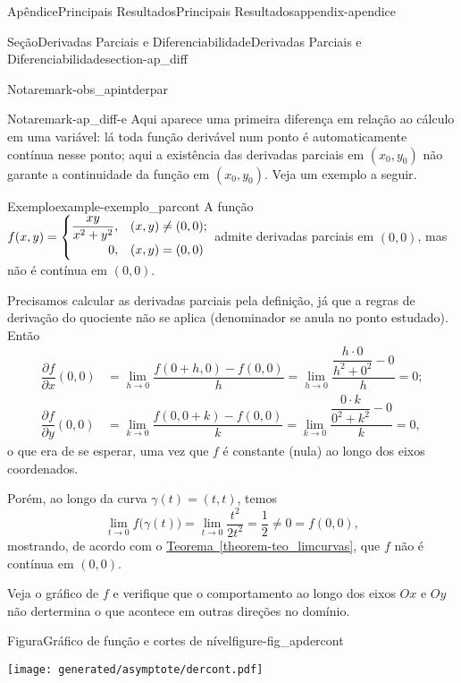 \documentclass[oneside,10pt,]{book}
\newcommand{\xreffont}{\relax}
\numberwithin{equation}{section}
\begin{document}
\begin{appendixptx}{Apêndice}{Principais Resultados}{}{Principais Resultados}{}{}{appendix-apendice}
\begin{sectionptx}{Seção}{Derivadas Parciais e Diferenciabilidade}{}{Derivadas Parciais e Diferenciabilidade}{}{}{section-ap_diff}
\begin{remark}{Nota}{}{remark-obs_apintderpar}
\end{remark}
\begin{remark}{Nota}{}{remark-ap_diff-e}%
Aqui aparece uma primeira diferença em relação ao cálculo em uma variável: lá toda função derivável num ponto é automaticamente contínua nesse ponto; aqui a existência das derivadas parciais em \((x_0,y_0)\) não garante a continuidade da função em \((x_0,y_0)\). Veja um exemplo a seguir.\end{remark}
\begin{example}{Exemplo}{}{example-exemplo_parcont}%
A função \(f(x,y)=\begin{cases}
\dfrac{xy}{x^2+y^2},&(x,y)\neq (0,0);\\
\hfill 0,& (x,y)=(0,0)\end{cases}\) admite derivadas parciais em \((0,0)\), mas não é contínua em \((0,0)\).%
\par
Precisamos calcular as derivadas parciais pela definição, já que a regras de derivação do quociente não se aplica (denominador se anula no ponto estudado). Então%
\begin{align*}
\dfrac{\partial f}{\partial x}(0,0)
&=\lim\limits_{h\to 0}\dfrac{f(0+h,0)-f(0,0)}{h}
=\lim\limits_{h\to 0}\dfrac{\dfrac{h\cdot 0}{h^2+0^2}-0}{h}
=0;\\
\dfrac{\partial f}{\partial y}(0,0)
&=\lim\limits_{k\to 0}\dfrac{f(0,0+k)-f(0,0)}{k}
=\lim\limits_{k\to 0}\dfrac{\dfrac{0\cdot k}{0^2+k^2}-0}{k}
=0,
\end{align*}
o que era de se esperar, uma vez que \(f\) é constante (nula) ao longo dos eixos coordenados.%
\par
Porém, ao longo da curva \(\gamma(t)=(t,t)\), temos%
\begin{equation*}
\lim\limits_{t\to 0}f\big(\gamma(t)\big)=\lim\limits_{t\to 0}
\dfrac{t^2}{2t^2}=\dfrac{1}{2}\neq 0=f(0,0),
\end{equation*}
mostrando, de acordo com o \hyperref[theorem-teo_limcurvas]{Teorema~{\xreffont\ref{theorem-teo_limcurvas}}}, que \(f\) não é contínua em \((0,0)\).%
\par
Veja o gráfico de \(f\) e verifique que o comportamento ao longo dos eixos \(Ox\) e \(Oy\) não dertermina o que acontece em outras direções no domínio. \begin{figureptx}{Figura}{Gráfico de função e cortes de nível}{figure-fig_apdercont}{}%
\begin{image}{0.25}{0.5}{0.25}{}%
\texttt{[image: generated/asymptote/dercont.pdf]}
\end{image}%

\end{figureptx}
\end{example}
\end{sectionptx}
\end{appendixptx}
\end{document}
